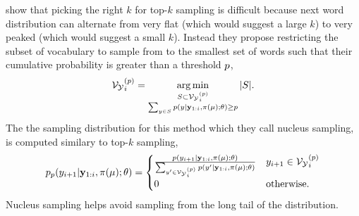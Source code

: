 \citet{nucleus} show that picking the right $k$ for top-$k$ sampling is 
difficult because next word distribution can alternate from very flat (which would suggest a large $k$) to very peaked (which would suggest a small $k$).
Instead they propose restricting the subset of vocabulary to sample 
from to the smallest set of words such that their cumulative probability
is greater than a threshold $p$,
\[ {\mathcal{V}_{\mathcal{Y}}}_i^{(p)} = \operatorname*{arg\,min}_{\substack{S \subset {\mathcal{V}_{\ensuremath{\mathcal{Y}}}}_i^{(p)} \\ \sum_{y \in S} p(y|\mathbf{y}_{1:i},\pi(\mu);\theta) \ge p  }} {\left\vert S \right\vert}. \] The the sampling distribution
for this method which they call nucleus sampling, is computed similary to top-$k$ sampling,
\[
    p_p(y_{i+1}|\mathbf{y}_{1:i},\pi(\mu);\theta)
    =
    \begin{cases} 
   \frac{
   p(y_{i+1}|\mathbf{y}_{1:i},\pi(\mu);\theta)
   }{ 
       \sum_{y^\prime \in {\mathcal{V}_{\ensuremath{\mathcal{Y}}}}_i^{(p)}}
   p(y^\prime|\mathbf{y}_{1:i},\pi(\mu);\theta)  
   }  & y_{i+1} \in {\mathcal{V}_{\ensuremath{\mathcal{Y}}}}_i^{(p)} \\ 
0 & \textrm{otherwise}. \end{cases} 
\]
Nucleus sampling helps avoid sampling from the long tail of the distribution.






